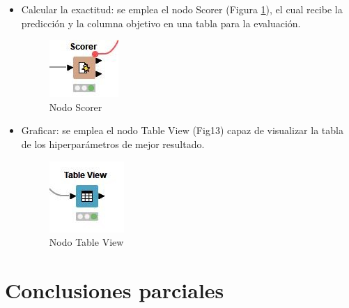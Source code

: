\begin{itemize}
	\item Calcular la exactitud: se emplea el nodo Scorer (Figura \ref{fig:nodo-scorer}), el cual recibe la predicción y la columna objetivo en una tabla para la evaluación. 
	\begin{figure}[H]
		\centering
		\includegraphics[width=0.15\linewidth]{"figuras/capi 2/nodo-scorer"}
		\caption[Nodo Scorer]{Nodo Scorer}
		\label{fig:nodo-scorer}
	\end{figure}
	
	\item Graficar: se emplea el nodo Table View (Fig13) capaz de visualizar la tabla de los hiperparámetros de mejor resultado.
	\begin{figure}[H]
		\centering
		\includegraphics[width=0.15\linewidth]{"figuras/capi 2/nodo-table-view"}
		\caption[Nodo Table View]{Nodo Table View}
		\label{fig:nodo-table-view}
	\end{figure}
	
\end{itemize}

\section{Conclusiones parciales}
\pagebreak

